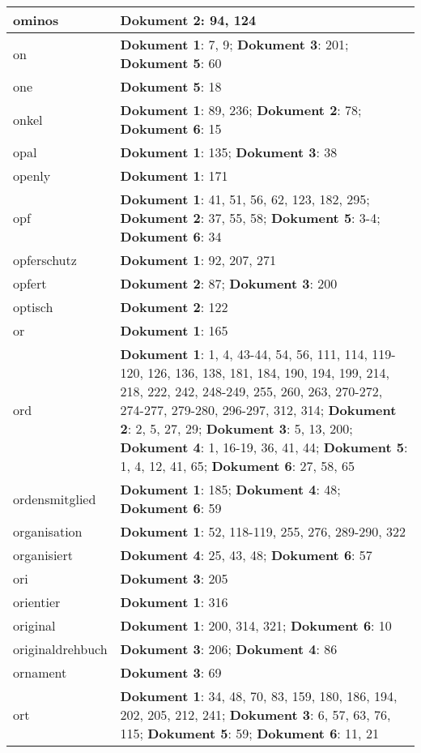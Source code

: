 \documentclass[a5paper]{article}
\begin{document}
\begin{longtable}[l]{|l|p{3in}|}
\hline
ominos & \textbf{Dokument 2}: 94, 124 \\
\hline
on & \textbf{Dokument 1}: 7, 9; \textbf{Dokument 3}: 201; \textbf{Dokument 5}: 60 \\
\hline
one & \textbf{Dokument 5}: 18 \\
\hline
onkel & \textbf{Dokument 1}: 89, 236; \textbf{Dokument 2}: 78; \textbf{Dokument 6}: 15 \\
\hline
opal & \textbf{Dokument 1}: 135; \textbf{Dokument 3}: 38 \\
\hline
openly & \textbf{Dokument 1}: 171 \\
\hline
opf & \textbf{Dokument 1}: 41, 51, 56, 62, 123, 182, 295; \textbf{Dokument 2}: 37, 55, 58; \textbf{Dokument 5}: 3-4; \textbf{Dokument 6}: 34 \\
\hline
opferschutz & \textbf{Dokument 1}: 92, 207, 271 \\
\hline
opfert & \textbf{Dokument 2}: 87; \textbf{Dokument 3}: 200 \\
\hline
optisch & \textbf{Dokument 2}: 122 \\
\hline
or & \textbf{Dokument 1}: 165 \\
\hline
ord & \textbf{Dokument 1}: 1, 4, 43-44, 54, 56, 111, 114, 119-120, 126, 136, 138, 181, 184, 190, 194, 199, 214, 218, 222, 242, 248-249, 255, 260, 263, 270-272, 274-277, 279-280, 296-297, 312, 314; \textbf{Dokument 2}: 2, 5, 27, 29; \textbf{Dokument 3}: 5, 13, 200; \textbf{Dokument 4}: 1, 16-19, 36, 41, 44; \textbf{Dokument 5}: 1, 4, 12, 41, 65; \textbf{Dokument 6}: 27, 58, 65 \\
\hline
ordensmitglied & \textbf{Dokument 1}: 185; \textbf{Dokument 4}: 48; \textbf{Dokument 6}: 59 \\
\hline
organisation & \textbf{Dokument 1}: 52, 118-119, 255, 276, 289-290, 322 \\
\hline
organisiert & \textbf{Dokument 4}: 25, 43, 48; \textbf{Dokument 6}: 57 \\
\hline
ori & \textbf{Dokument 3}: 205 \\
\hline
orientier & \textbf{Dokument 1}: 316 \\
\hline
original & \textbf{Dokument 1}: 200, 314, 321; \textbf{Dokument 6}: 10 \\
\hline
originaldrehbuch & \textbf{Dokument 3}: 206; \textbf{Dokument 4}: 86 \\
\hline
ornament & \textbf{Dokument 3}: 69 \\
\hline
ort & \textbf{Dokument 1}: 34, 48, 70, 83, 159, 180, 186, 194, 202, 205, 212, 241; \textbf{Dokument 3}: 6, 57, 63, 76, 115; \textbf{Dokument 5}: 59; \textbf{Dokument 6}: 11, 21 \\

\end{longtable}
\end{document}
